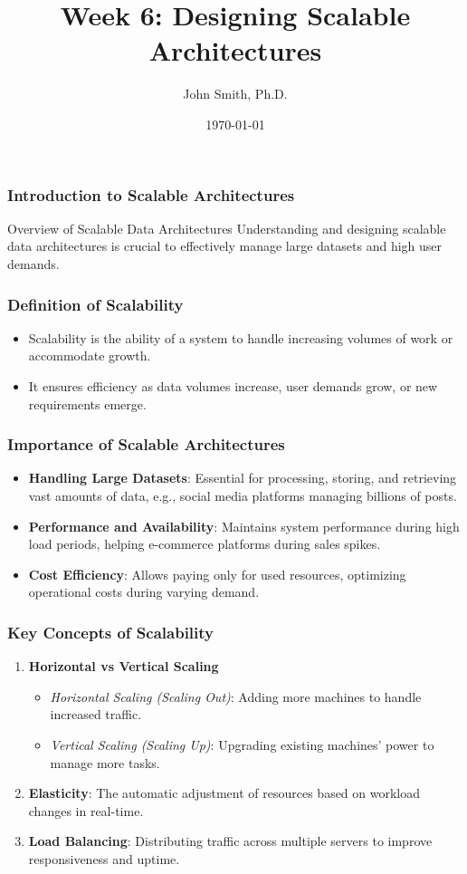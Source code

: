 \documentclass[aspectratio=169]{beamer}
\title[Week 6: Designing Scalable Architectures]{Week 6: Designing Scalable Architectures}
\author[J. Smith]{John Smith, Ph.D.}
\institute[University Name]{
  Department of Computer Science\\
  University Name\\
  \vspace{0.3cm}
  Email: email@university.edu\\
  Website: www.university.edu
}
\date{\today}
\begin{document}
\frame{\titlepage}

\begin{frame}[fragile]
    \frametitle{Introduction to Scalable Architectures}
    \begin{block}{Overview of Scalable Data Architectures}
        Understanding and designing scalable data architectures is crucial to effectively manage large datasets and high user demands. 
    \end{block}
\end{frame}

\begin{frame}[fragile]
    \frametitle{Definition of Scalability}
    \begin{itemize}
        \item Scalability is the ability of a system to handle increasing volumes of work or accommodate growth.
        \item It ensures efficiency as data volumes increase, user demands grow, or new requirements emerge.
    \end{itemize}
\end{frame}

\begin{frame}[fragile]
    \frametitle{Importance of Scalable Architectures}
    \begin{itemize}
        \item \textbf{Handling Large Datasets}: Essential for processing, storing, and retrieving vast amounts of data, e.g., social media platforms managing billions of posts.
        \item \textbf{Performance and Availability}: Maintains system performance during high load periods, helping e-commerce platforms during sales spikes.
        \item \textbf{Cost Efficiency}: Allows paying only for used resources, optimizing operational costs during varying demand.
    \end{itemize}
\end{frame}

\begin{frame}[fragile]
    \frametitle{Key Concepts of Scalability}
    \begin{enumerate}
        \item \textbf{Horizontal vs Vertical Scaling}
            \begin{itemize}
                \item \textit{Horizontal Scaling (Scaling Out)}: Adding more machines to handle increased traffic.
                \item \textit{Vertical Scaling (Scaling Up)}: Upgrading existing machines' power to manage more tasks.
            \end{itemize}
        \item \textbf{Elasticity}: The automatic adjustment of resources based on workload changes in real-time.
        \item \textbf{Load Balancing}: Distributing traffic across multiple servers to improve responsiveness and uptime.
    \end{enumerate}
\end{frame}
\end{document}
